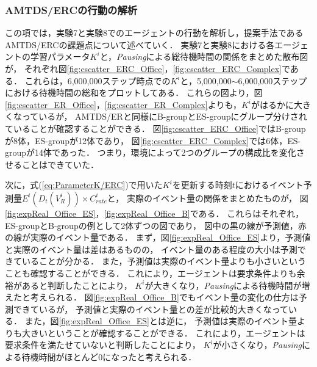 \documentclass[12pt,a4j,twoside]{jarticle}
\begin{document}
  \subsubsection{AMTDS/ERCの行動の解析}\label{sec:expAnalsisERC}
  この項では，実験7と実験8でのエージェントの行動を解析し，提案手法であるAMTDS/ERCの課題点について述べていく．
  実験7と実験8における各エージェントの学習パラメータ$K^i$と，{\em Pausing}による総待機時間の関係をまとめた散布図が，
  それぞれ図\ref{fig:cscatter_ERC_Office}，\ref{fig:cscatter_ERC_Complex}である．
  これらは，6,000,000ステップ時点での$K^i$と，5,000,000$\sim$6,000,000ステップにおける待機時間の総和をプロットしてある．
  これらの図より，図\ref{fig:cscatter_ER_Office}，\ref{fig:cscatter_ER_Complex}よりも，$K^i$がはるかに大きくなっているが，
  AMTDS/ERと同様にB-groupとES-groupにグループ分けされていることが確認することができる．
  図\ref{fig:cscatter_ERC_Office}ではB-groupが8体，ES-groupが12体であり，
  図\ref{fig:cscatter_ERC_Complex}では6体，ES-groupが14体であった．
  つまり，環境によって2つのグループの構成比を変化させることはできていた．
  \par

  次に，式(\ref{eq:ParameterK/ERC})で用いた$K^i$を更新する時刻$t$におけるイベント予測量$E^i(D_t(V^i_R)) \times C^i_{rate}$と，
  実際のイベント量の関係をまとめたものが，
  図\ref{fig:expReal_Office_ES}，\ref{fig:expReal_Office_B}である．
  これらはそれぞれ，ES-groupとB-groupの例として2体ずつの図であり，
  図中の黒の線が予測値，赤の線が実際のイベント量である．
  まず，図\ref{fig:expReal_Office_ES}より，予測値と実際のイベント量は差はあるものの，
  イベント量のある程度の大小は予測できていることが分かる．
  また，予測値は実際のイベント量よりも小さいということも確認することができる．
  これにより，エージェントは要求条件よりも余裕があると判断したことにより，
  $K^i$が大きくなり，{\em Pausing}による待機時間が増えたと考えられる．
  図\ref{fig:expReal_Office_B}でもイベント量の変化の仕方は予測できているが，
  予測値と実際のイベント量との差が比較的大きくなっている．
  また，図\ref{fig:expReal_Office_ES}とは逆に，
  予測値は実際のイベント量よりも大きいということが確認することができる．
  これにより，エージェントは要求条件を満たせていないと判断したことにより，
  $K^i$が小さくなり，{\em Pausing}による待機時間がほとんど0になったと考えられる．
  \par
\end{document}
